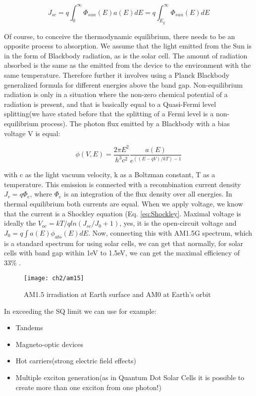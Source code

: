 \begin{equation}
J_{sc} = q \int_0 ^{\infty } \Phi _{sun}(E)a(E)dE=q \int_{E_g} ^{\infty } \Phi _{sun}(E)dE
\end{equation}

Of course, to conceive the thermodynamic equilibrium, there needs to be an opposite process to absorption. We assume that the light emitted from the Sun is in the form of Blackbody radiation, as is the solar cell. The amount of radiation absorbed is the same as the emitted from the device to the environment with the same temperature. Therefore further it involves using a Planck Blackbody generalized formula for different energies above the band gap. Non-equilibrium radiation is only in a situation where the non-zero chemical potential of a radiation is present, and that is basically equal to a Quasi-Fermi level splitting(we have stated before that the splitting of a Fermi level is a non-equilibrium process). The photon flux emitted by a Blackbody with a bias voltage V is equal:

\begin{equation}
\phi (V,E) = \frac{2\pi E^2}{h^3c^2}\frac{a(E)}{e^{(( E-qV)/kT) - 1}}
\end{equation}

with c as the light vacuum velocity, k as a Boltzman constant, T as a temperature. This emission is connected with a recombination current density $J_r = q\Phi _e$, where $\Phi  _e$ is an integration of the flux density over all energies. In thermal equilibrium both currents are equal. When we apply voltage, we know that the current is a Shockley equation (Eq. \ref{eq:Shockley}. Maximal voltage is ideally the $V_{oc} = kT/qln(J_{sc}/J_{0} + 1)$, yes, it is the open-circuit voltage and $J_0 = q \int a(E)\phi _{abs}(E) dE$. Now, connecting this with AM1.5G spectrum, which is a standard spectrum for using solar cells, we can get that normally, for solar cells with band gap within 1eV to 1.5eV, we can get the maximal efficiency of 33\%  . \cite{limit}

\begin{figure}
\centering
\texttt{[image: ch2/am15]}
\caption{AM1.5 irradiation at Earth surface\cite{am} and AM0 at Earth's orbit}
\label{fig:AM15}
\end{figure}

In exceeding the SQ limit we can use for example:
\begin{itemize}
\item Tandems
\item Magneto-optic devices
\item Hot carriers(strong electric field effects)
\item Multiple exciton generation(as in Quantum Dot Solar Cells it is possible to create more than one exciton from one photon!)
\end{itemize}

